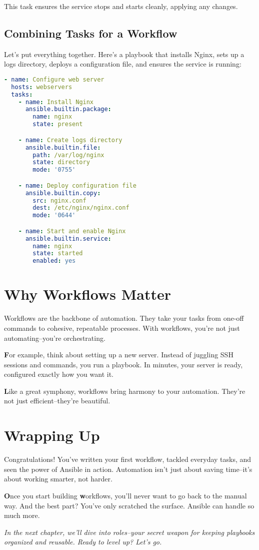 This task ensures the service stops and starts cleanly, applying any changes.

\subsection{Combining Tasks for a Workflow}

Let's put everything together. Here's a playbook that installs Nginx, sets up a logs directory, deploys a configuration file, and ensures the service is running:
\begin{lstlisting}[language=yaml, caption=A Complete Workflow]
- name: Configure web server
  hosts: webservers
  tasks:
    - name: Install Nginx
      ansible.builtin.package:
        name: nginx
        state: present

    - name: Create logs directory
      ansible.builtin.file:
        path: /var/log/nginx
        state: directory
        mode: '0755'

    - name: Deploy configuration file
      ansible.builtin.copy:
        src: nginx.conf
        dest: /etc/nginx/nginx.conf
        mode: '0644'

    - name: Start and enable Nginx
      ansible.builtin.service:
        name: nginx
        state: started
        enabled: yes
\end{lstlisting}

\section{Why Workflows Matter}

Workflows are the backbone of automation. They take your tasks from one-off commands to cohesive, repeatable processes. With workflows, you're not just automating--you're orchestrating.

\textbf{F}or example, think about setting up a new server. Instead of juggling SSH sessions and commands, you run a playbook. In minutes, your server is ready, configured exactly how you want it.


\textbf{L}ike a great symphony, workflows bring harmony to your automation. They're not just efficient--they're beautiful.

\section{Wrapping Up}

Congratulations! You've written your first workflow, tackled everyday tasks, and seen the power of Ansible in action. Automation isn't just about saving time--it's about working smarter, not harder.

\textbf{O}nce you start building \textbf{w}orkflows, you'll never want to go back to the manual way. And the best part? You've only scratched the surface. Ansible can handle so much more.

\vspace{1em}

\textit{In the next chapter, we'll dive into roles--your secret weapon for keeping playbooks organized and reusable. Ready to level up? Let's go.}
